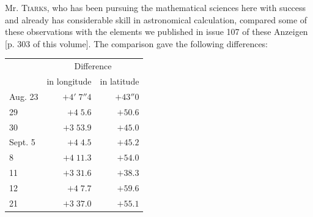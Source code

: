 \par\indent Mr. \textsc{Tiarks}, who has been pursuing the mathematical sciences here with success and already has considerable skill in astronomical calculation, compared some of these observations with the elements we published in issue 107 of these Anzeigen [p. 303 of this volume]. The comparison gave the following differences:


\begin{center}\fontsize{10}{12}\selectfont\setlength{\tabcolsep}{5pt}\renewcommand{\arraystretch}{1.15}\begin{tabular}{lrr}
 & \multicolumn{2}{c}{Difference}\\
 & in longitude & in latitude\\\hline
Aug. 23 & $+4'\;7''4$ & $+43''0$\\
29 & $+4\;5.6$ & $+50.6$\\
30 & $+3\;53.9$ & $+45.0$\\
Sept. 5 & $+4\;4.5$ & $+45.2$\\
8 & $+4\;11.3$ & $+54.0$\\
11 & $+3\;31.6$ & $+38.3$\\
12 & $+4\;7.7$ & $+59.6$\\
21 & $+3\;37.0$ & $+55.1$\\
\end{tabular}\end{center}


